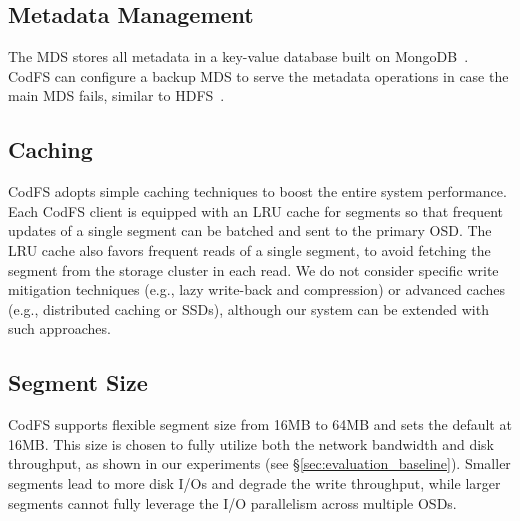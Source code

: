 \subsection{Metadata Management} The MDS stores all metadata in a
key-value database built on MongoDB~\cite{mongodb}. CodFS can configure a
backup MDS to serve the metadata operations in case the main MDS fails,
similar to HDFS~\cite{hdfs_architecture}. 

\subsection{Caching} CodFS adopts simple caching techniques to boost the entire
system performance.  Each CodFS client is equipped with an LRU cache for
segments so that frequent updates of a single segment can be batched and sent
to the primary OSD. 
The LRU cache also favors frequent reads of a single segment, to avoid
fetching the segment from the storage cluster in each read.  We do not
consider specific write mitigation techniques (e.g., lazy write-back and
compression) or advanced caches (e.g., distributed caching or SSDs), although
our system can be extended with such approaches. 


\subsection{Segment Size} CodFS supports flexible segment size from
16MB to 64MB and sets the default at 16MB. This size is chosen to fully
utilize both the network bandwidth and disk throughput, as shown in our 
experiments (see \S\ref{sec:evaluation_baseline}). Smaller segments
lead to more disk I/Os and degrade the write throughput, while larger 
segments cannot fully leverage the I/O parallelism across multiple OSDs. 


